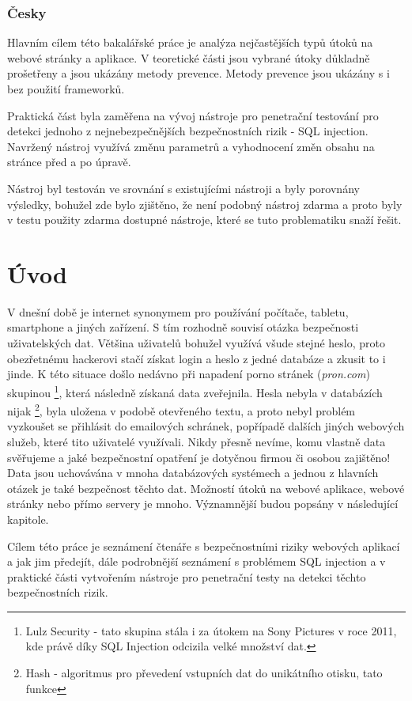 \documentclass[12pt, a4paper]{report}
\begin{document}
\subsection*{Česky}
Hlavním cílem této bakalářské práce je analýza nejčastějších typů útoků na webové stránky a aplikace. V teoretické části jsou vybrané útoky důkladně prošetřeny a jsou ukázány metody prevence. Metody prevence jsou ukázány s i bez použití frameworků.

Praktická část byla zaměřena na vývoj nástroje pro penetrační testování pro detekci jednoho z nejnebezpečnějších bezpečnostních rizik - SQL injection. Navržený nástroj využívá změnu parametrů a vyhodnocení změn obsahu na stránce před a po úpravě.

Nástroj byl testován ve srovnání s existujícími nástroji a byly porovnány výsledky, bohužel zde bylo zjištěno, že není podobný nástroj zdarma a proto byly v testu použity zdarma dostupné nástroje, které se tuto problematiku snaží řešit.


\chapter{Úvod}
V dnešní době je internet synonymem pro používání počítače, tabletu, smartphone a jiných zařízení. S tím rozhodně souvisí otázka bezpečnosti uživatelských dat. Většina uživatelů bohužel využívá všude stejné heslo, proto obezřetnému hackerovi stačí získat login a heslo z jedné databáze a zkusit to i jinde. K této situace došlo nedávno při napadení porno stránek (\textit{pron.com}) skupinou \footnote{Lulz Security - tato skupina stála i za útokem na Sony Pictures v roce 2011, kde právě díky SQL Injection odcizila velké množství dat.}, která následně získaná data zveřejnila\cite{examiner}. Hesla nebyla v databázích nijak \footnote{Hash - algoritmus pro převedení vstupních dat do unikátního otisku, tato funkce }, byla uložena v podobě otevřeného textu, a proto nebyl problém vyzkoušet se přihlásit do emailových schránek, popřípadě dalších jiných webových služeb, které tito uživatelé využívali. Nikdy přesně nevíme, komu vlastně data svěřujeme a jaké bezpečnostní opatření je dotyčnou firmou či osobou zajištěno! Data jsou uchovávána v mnoha databázových systémech a jednou z hlavních otázek je také bezpečnost těchto dat. Možností útoků na webové aplikace, webové stránky nebo přímo servery je mnoho. Významnější budou popsány v následující kapitole.

Cílem této práce je seznámení čtenáře s bezpečnostními riziky webových aplikací a jak jim předejít, dále podrobnější seznámení s problémem SQL injection a v praktické části vytvořením nástroje pro penetrační testy na detekci těchto bezpečnostních rizik.
\end{document}
